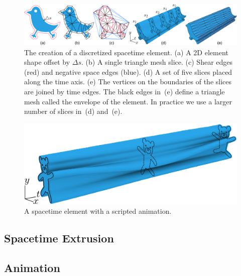 \begin{figure}
\centering
\includegraphics[width=1.0\textwidth]{figures/animationpak/discretization.pdf} 
\caption[The creation of a discretized spacetime element]
{\label{fig_discretization} 
The creation of a discretized spacetime element.  
(a) A 2D element shape offset by $\Delta s$.
(b) A single triangle mesh slice.
(c) Shear edges (red) and negative space edges (blue).
(d) A set of five slices placed along the time axis.
(e) The vertices on the boundaries of the slices are joined by 
	time edges.  The black edges in~(e) define a triangle mesh
	called the envelope of the element.
	In practice we use a larger number of slices in~(d) and~(e).
}
\end{figure}

\begin{figure}
\centering
\includegraphics[width=1.0\columnwidth]{figures/animationpak/spacetime_element.pdf} 
\caption[A spacetime element with a scripted animation]
{\label{fig_spacetime_element} 
A spacetime element with a scripted animation.}
\end{figure}


\subsection{Spacetime Extrusion}
\label{animationpak_}


\subsection{Animation}
\label{animationpak_}


